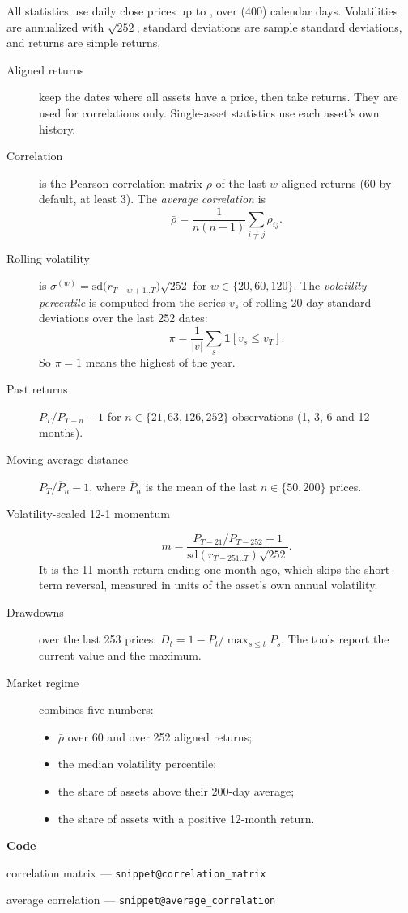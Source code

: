 \documentclass[11pt,a4paper]{article}
\makeatletter
\newcommand{\snippetsource}[1]{\csname snippet@#1\endcsname}
\newcommand{\snippet}[3]{%
  }
\newenvironment{codepointers}{%
  \par\smallskip\begingroup\footnotesize\noindent\textcolor{blue!50!black}{\textbf{Code}}\par\nopagebreak
  \begin{list}{}{\setlength{\leftmargin}{1.2em}\setlength{\itemsep}{0pt}\setlength{\parsep}{0pt}\setlength{\topsep}{1pt}}}%
  {\end{list}\endgroup\smallskip}
\newcommand{\codeitem}[2]{\item #2 --- \texttt{\snippetsource{#1}}}
\makeatother
\begin{document}
All statistics use daily close prices up to , over
 (400) calendar days. Volatilities are annualized with
$\sqrt{252}$, standard deviations are sample standard deviations, and returns are simple
returns.
\begin{description}
  \item[Aligned returns] keep the dates where all assets have a price, then take returns.
        They are used for correlations only. Single-asset statistics use each asset's own
        history.
  \item[Correlation] is the Pearson correlation matrix $\rho$ of the last $w$ aligned
        returns (60 by default, at least 3). The \emph{average correlation} is
        \[
          \bar\rho=\frac{1}{n(n-1)}\sum_{i\ne j}\rho_{ij}.
        \]
  \item[Rolling volatility] is
        $\sigma^{(w)}=\mathrm{sd}\big(r_{T-w+1..T}\big)\sqrt{252}$ for
        $w\in\{20,60,120\}$. The \emph{volatility percentile} is computed from the series
        $v_s$ of rolling 20-day standard deviations over the last 252 dates:
        \[
          \pi=\frac{1}{|v|}\sum_s\mathbf 1[v_s\le v_T].
        \]
        So $\pi=1$ means the highest of the year.
  \item[Past returns] $P_T/P_{T-n}-1$ for $n\in\{21,63,126,252\}$ observations
        (1, 3, 6 and 12 months).
  \item[Moving-average distance] $P_T/\overline P_n-1$, where $\overline P_n$ is the mean
        of the last $n\in\{50,200\}$ prices.
  \item[Volatility-scaled 12-1 momentum]
        \[
          m=\frac{P_{T-21}/P_{T-252}-1}{\mathrm{sd}(r_{T-251..T})\sqrt{252}} .
        \]
        It is the 11-month return ending one month ago, which skips the short-term
        reversal, measured in units of the asset's own annual volatility.
  \item[Drawdowns] over the last 253 prices: $D_t=1-P_t/\max_{s\le t}P_s$. The tools
        report the current value and the maximum.
  \item[Market regime] combines five numbers:
        \begin{itemize}
          \item $\bar\rho$ over 60 and over 252 aligned returns;
          \item the median volatility percentile;
          \item the share of assets above their 200-day average;
          \item the share of assets with a positive 12-month return.
        \end{itemize}
\end{description}
\snippet{trend_signals}{Python}{Trend signals}
\snippet{rolling_volatility}{Python}{Volatilities and their percentile}
\snippet{market_regime}{Python}{Market regime}
\begin{codepointers}
  \codeitem{correlation_matrix}{correlation matrix}
  \codeitem{average_correlation}{average correlation}
\end{codepointers}
\end{document}
